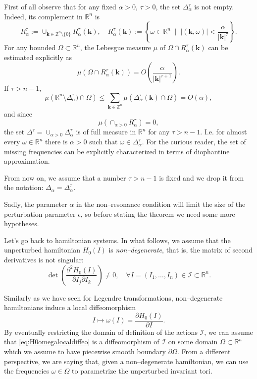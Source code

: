 \documentclass[english,fontsize=11pt,paper=a5,oneside]{scrbook}
\newcommand{\cI}{\mathcal{I}}
\newcommand{\Z}{\mathbb{Z}}
\newcommand{\R}{\mathbb{R}}
\theoremstyle{definition}
\begin{document}
First of all observe that for any fixed $\alpha>0$, $\tau>0$, the set $\Delta_\alpha^\tau$ is not empty. Indeed, its complement in $\R^n$ is
\begin{equation}
    R_{\alpha}^\tau := \cup_{\bm k \in \Z^n\setminus\{0\}} R_{\alpha}^\tau(\bm k),\quad
    R_{\alpha}^\tau(\bm k) := \left\{ \omega \in\R^n \;\mid\; |(\bm k, \omega)| < \frac{\alpha}{|\bm k|^\tau} \right\}.
\end{equation}
For any bounded $\Omega\subset\R^n$, the Lebesgue measure $\mu$ of $\Omega\cap R_{\alpha}^\tau(\bm k)$ can be estimated explicitly as
\begin{equation}
    \mu(\Omega\cap R_{\alpha}^\tau(\bm k)) = O\left(\frac{\alpha}{|\bm k|^{\tau+1}}\right).
\end{equation}
If $\tau > n-1$, 
\begin{equation}
    \mu\left(\R^n\setminus\Delta_\alpha^\tau)\cap\Omega\right)\leq
    \sum_{\bm k\in\Z^n} \mu\left(\Delta_{\alpha}^\tau(\bm k)\cap\Omega\right) = O(\alpha),
\end{equation}
and since
\begin{equation}
    \mu\left(\cap_{\alpha>0}R_{\alpha}^\tau\right)=0,
\end{equation}
the set $\Delta^\tau = \cup_{\alpha>0}\Delta_\alpha^\tau$ is of full measure in $\R^n$ for any $\tau > n-1$. I.e. for almost every $\omega\in\R^n$ there is $\alpha>0$ such that $\omega \in \Delta^\tau_\alpha$.
For the curious reader, the set of missing frequencies can be explicitly characterized in terms of diophantine approximation.

From now on, we assume that a number $\tau > n-1$ is fixed and we drop it from the notation: $\Delta_\alpha = \Delta_\alpha^\tau$.

Sadly, the parameter $\alpha$ in the non--resonance condition will limit the size of the perturbation parameter $\epsilon$, so before stating the theorem we need some more hypotheses.

Let's go back to hamiltonian systems.
In what follows, we assume that the unperturbed hamiltonian $H_0(I)$ is \emph{non--degenerate}, that is, the matrix of second derivatives is not singular:
\begin{equation}\label{eq:Hnondeg}
    \det\left(\frac{\partial^2 H_0(I)}{\partial I_j \partial I_k}\right) \neq 0, \quad \forall I = (I_1, \ldots, I_n)\in\cI\subset\R^n.
\end{equation}

Similarly as we have seen for Legendre transformations, non--degenerate hamiltonians induce a local diffeomorphism
\begin{equation}\label{eq:H0omegalocaldiffeo}
    I \mapsto \omega(I) = \frac{\partial H_0(I)}{\partial I}.
\end{equation}
By eventually restricting the domain of definition of the actions $\cI$, we can assume that \eqref{eq:H0omegalocaldiffeo} is a diffeomorphism of $\cI$ on some domain $\Omega\subset\R^n$ which we assume to have piecewise smooth boundary $\partial\Omega$.
From a different perspective, we are saying that, given a non--degenerate hamiltonian, we can use the frequencies $\omega\in\Omega$ to parametrize the unperturbed invariant tori.
\end{document}

